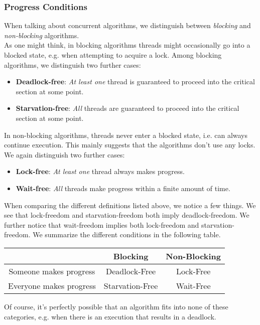 \documentclass[main]{subfiles}
\begin{document}
\subsubsection{Progress Conditions} \label{progress conditions}
When talking about concurrent algorithms, we distinguish between \textit{blocking} and \textit{non-blocking} algorithms.\\[3mm]
As one might think, in blocking algorithms threads might occasionally go into a blocked state, e.g. when attempting to acquire a lock. Among blocking algorithms, we distinguish two further cases:
\begin{itemize}
    \item \textbf{Deadlock-free}: \textit{At least one} thread is guaranteed to proceed into the critical section at some point.
    \item \textbf{Starvation-free}: \textit{All} threads are guaranteed to proceed into the critical section at some point.
\end{itemize} 
In non-blocking algorithms, threads never enter a blocked state, i.e. can always continue execution. This mainly suggests that the algorithms don't use any locks. We again distinguish two further cases:
\begin{itemize}
    \item \textbf{Lock-free}: \textit{At least one} thread always makes progress.
    \item \textbf{Wait-free}: \textit{All} threads make progress within a finite amount of time.
\end{itemize}
When comparing the different definitions listed above, we notice a few things. We see that lock-freedom and starvation-freedom both imply deadlock-freedom. We further notice that wait-freedom implies both lock-freedom and starvation-freedom. We summarize the different conditions in the following table.
\begin{center}
    \begin{tabular}{c|c|c}
         &  Blocking & Non-Blocking\\
         \hline
        Someone makes progress & Deadlock-Free & Lock-Free \\
        \hline
        Everyone makes progress & Starvation-Free & Wait-Free
    \end{tabular}
\end{center}
\noindent Of course, it's perfectly possible that an algorithm fits into none of these categories, e.g. when there is an execution that results in a deadlock.\clearpage
\end{document}
